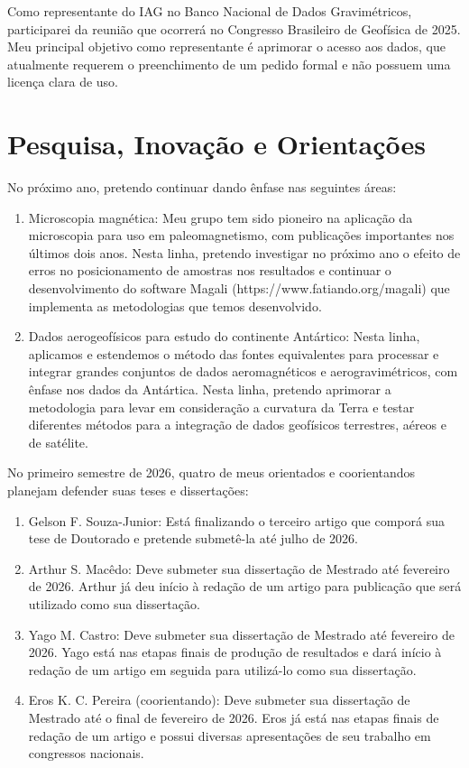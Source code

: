 \documentclass[12pt,a4paper,oneside]{book}
\begin{document}
Como representante do IAG no Banco Nacional de Dados Gravimétricos,
participarei da reunião que ocorrerá no Congresso Brasileiro de Geofísica de
2025. Meu principal objetivo como representante é aprimorar o acesso aos dados,
que atualmente requerem o preenchimento de um pedido formal e não possuem uma
licença clara de uso.

\chapter{Pesquisa, Inovação e Orientações}

No próximo ano, pretendo continuar dando ênfase nas seguintes áreas:

\begin{enumerate}
\item Microscopia magnética: Meu grupo tem sido pioneiro na aplicação da
   microscopia para uso em paleomagnetismo, com publicações importantes nos
   últimos dois anos. Nesta linha, pretendo investigar no próximo ano o efeito
   de erros no posicionamento de amostras nos resultados e continuar
   o desenvolvimento do software Magali (https://www.fatiando.org/magali) que
   implementa as metodologias que temos desenvolvido.
\item Dados aerogeofísicos para estudo do continente Antártico: Nesta linha,
   aplicamos e estendemos o método das fontes equivalentes para processar
   e integrar grandes conjuntos de dados aeromagnéticos e aerogravimétricos,
   com ênfase nos dados da Antártica. Nesta linha, pretendo aprimorar
   a metodologia para levar em consideração a curvatura da Terra e testar
   diferentes métodos para a integração de dados geofísicos terrestres, aéreos
   e de satélite.
\end{enumerate}

No primeiro semestre de 2026, quatro de meus orientados e coorientandos
planejam defender suas teses e dissertações:

\begin{enumerate}
\item Gelson F. Souza-Junior: Está finalizando o terceiro artigo que comporá sua
   tese de Doutorado e pretende submetê-la até julho de 2026.
\item Arthur S. Macêdo: Deve submeter sua dissertação de Mestrado até fevereiro de
   2026. Arthur já deu início à redação de um artigo para publicação que
   será utilizado como sua dissertação.
\item Yago M. Castro: Deve submeter sua dissertação de Mestrado até fevereiro de
   2026. Yago está nas etapas finais de produção de resultados e dará início
         à redação de um artigo em seguida para utilizá-lo como sua
         dissertação.
\item Eros K. C. Pereira (coorientando): Deve submeter sua dissertação de Mestrado
   até o final de fevereiro de 2026. Eros já está nas etapas finais de redação
   de um artigo e possui diversas apresentações de seu trabalho em congressos
   nacionais.
\end{enumerate}
\end{document}
